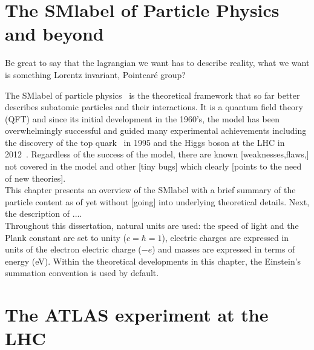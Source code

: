 \chapter{The \acrlong{SMlabel} of Particle Physics and beyond}

Be great to say that the lagrangian we want has to describe reality, what we want is something Lorentz invariant, Pointcaré group?

The \acrfull{SMlabel} of particle physics~\cite{PhysRevLett.19.1264,GLASHOW1961579,RevModPhys.52.525} is the theoretical framework that so far better describes subatomic particles and their interactions. It is a quantum field theory (QFT) and since its initial development in the 1960's, the model has been overwhelmingly successful and guided many experimental achievements including the discovery of the top quark~\cite{topsearch1995,PhysRevLett.74.2626} in 1995 and the Higgs boson at the LHC in 2012~\cite{ATLASHiggs2012,CMShiggs2012}. Regardless of the success of the model, there are known [weaknesses,flaws,] not covered in the model and other [tiny bugs] which clearly [points to the need of new theories].\\
This chapter presents an overview of the \acrshort{SMlabel} with a brief summary of the particle content as of yet without [going] into underlying theoretical details. Next, the description of ....\\

Throughout this dissertation, natural units are used: the speed of light and the Plank constant are set to unity ($c=\hbar=1$), electric charges are expressed in units of the electron electric charge ($-e$) and masses are expressed in terms of energy (eV). Within the theoretical developments in this chapter, the Einstein's summation convention is used by default. 



\chapter{The ATLAS experiment at the LHC}


